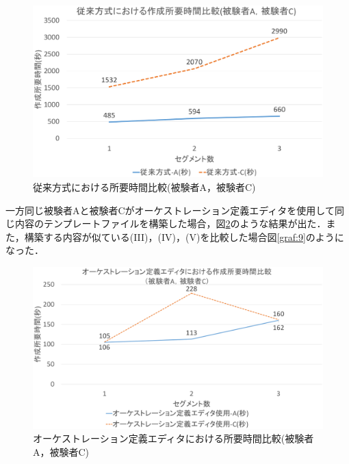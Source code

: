 \documentclass[mingoth]{kut-paper}		%
\begin{document}
		\begin{figure}[H]
			\begin{center}
				\includegraphics[scale=0.45]{Document/ManualComparisonAC.eps}
				\caption{従来方式における所要時間比較(被験者A，被験者C)}
				\label{graf:4}
			\end{center}
		\end{figure}
		\newpage
		一方同じ被験者Aと被験者Cがオーケストレーション定義エディタを使用して同じ内容のテンプレートファイルを構築した場合，図\ref{graf:5}のような結果が出た．また，構築する内容が似ている(I\hspace{-1pt}I\hspace{-1pt}I)，(I\hspace{-1pt}V)，(V)を比較した場合図\ref{graf:9}のようになった．
			
		\begin{figure}[H]
			\begin{center}
				\includegraphics[scale=0.45]{Document/EditorComparisonAC.eps}
				\caption{オーケストレーション定義エディタにおける所要時間比較(被験者A，被験者C)}
				\label{graf:5}
			\end{center}
		\end{figure}
		
\end{document}

